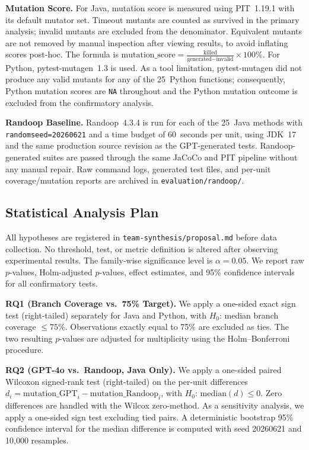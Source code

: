 \documentclass[conference]{IEEEtran}
\begin{document}
\textbf{Mutation Score.}
For Java, mutation score is measured using PIT~1.19.1 with its default mutator
set.
Timeout mutants are counted as survived in the primary analysis; invalid mutants
are excluded from the denominator.
Equivalent mutants are not removed by manual inspection after viewing results, to
avoid inflating scores post-hoc.
The formula is
$\text{mutation\_score} = \frac{\text{killed}}{\text{generated} - \text{invalid}} \times 100\%$.
For Python, pytest-mutagen~1.3 is used.
As a tool limitation, pytest-mutagen did not produce any valid mutants for any
of the 25~Python functions; consequently, Python mutation scores are \texttt{NA}
throughout and the Python mutation outcome is excluded from the confirmatory
analysis.

\textbf{Randoop Baseline.}
Randoop~4.3.4 is run for each of the 25~Java methods with
\texttt{randomseed=20260621} and a time budget of 60~seconds per unit, using
JDK~17 and the same production source revision as the GPT-generated tests.
Randoop-generated suites are passed through the same JaCoCo and PIT pipeline
without any manual repair.
Raw command logs, generated test files, and per-unit coverage/mutation reports
are archived in \texttt{evaluation/randoop/}.

\subsection{Statistical Analysis Plan}
\label{subsec:statistics}

All hypotheses are registered in \texttt{team-synthesis/proposal.md} before data
collection.
No threshold, test, or metric definition is altered after observing experimental
results.
The family-wise significance level is $\alpha = 0.05$.
We report raw $p$-values, Holm-adjusted $p$-values, effect estimates, and 95\%
confidence intervals for all confirmatory tests.

\textbf{RQ1 (Branch Coverage vs.\ 75\% Target).}
We apply a one-sided exact sign test (right-tailed) separately for Java and
Python, with $H_0$: median branch coverage $\leq 75\%$.
Observations exactly equal to 75\% are excluded as ties.
The two resulting $p$-values are adjusted for multiplicity using the
Holm--Bonferroni procedure.

\textbf{RQ2 (GPT-4o vs.\ Randoop, Java Only).}
We apply a one-sided paired Wilcoxon signed-rank test (right-tailed) on the
per-unit differences $d_i = \text{mutation\_GPT}_i - \text{mutation\_Randoop}_i$,
with $H_0$: $\text{median}(d) \leq 0$.
Zero differences are handled with the Wilcox zero-method.
As a sensitivity analysis, we apply a one-sided sign test excluding tied pairs.
A deterministic bootstrap 95\% confidence interval for the median difference is
computed with seed 20260621 and 10,000 resamples.
\end{document}
